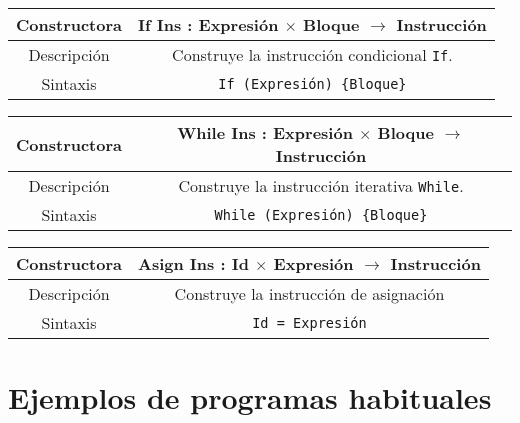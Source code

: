 \documentclass[10pt,a4paper]{article}
\begin{document}
\begin{table}[h]
    \begin{tabular}[h]{|c|c|}
        \hline
        Constructora & If Ins : Expresión $\times$ Bloque $\rightarrow$ Instrucción \\
        \hline
        Descripción & Construye la instrucción condicional \texttt{If}. \\
        \hline
        Sintaxis & \texttt{If (Expresión) \{Bloque\}} \\
        \hline
    \end{tabular}
\end{table}

\begin{table}[h]
    \begin{tabular}[h]{|c|c|}
        \hline
        Constructora & While Ins : Expresión $\times$ Bloque $\rightarrow$ Instrucción \\
        \hline
        Descripción & Construye la instrucción iterativa \texttt{While}. \\
        \hline
        Sintaxis & \texttt{While (Expresión) \{Bloque\}} \\
        \hline
    \end{tabular}
\end{table}

\begin{table}[h]
    \begin{tabular}[h]{|c|c|}
        \hline
        Constructora & Asign Ins : Id $\times$ Expresión $\rightarrow$ Instrucción \\
        \hline
        Descripción & Construye la instrucción de asignación \\
        \hline
        Sintaxis & \texttt{Id = Expresión} \\
        \hline
    \end{tabular}
\end{table}


\newpage
\appendix

\section{Ejemplos de programas habituales}\label{sec:Ejemplos de programas habituales}






\end{document}
